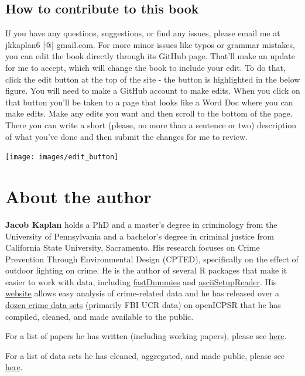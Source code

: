 \documentclass[
  12pt,
  openany]{book}
\begin{document}
\hypertarget{how-to-contribute-to-this-book}{%
\section{How to contribute to this book}\label{how-to-contribute-to-this-book}}

If you have any questions, suggestions, or find any issues, please email me at jkkaplan6 {[}@{]} gmail.com. For more minor issues like typos or grammar mistakes, you can edit the book directly through its GitHub page. That'll make an update for me to accept, which will change the book to include your edit. To do that, click the edit button at the top of the site - the button is highlighted in the below figure. You will need to make a GitHub account to make edits. When you click on that button you'll be taken to a page that looks like a Word Doc where you can make edits. Make any edits you want and then scroll to the bottom of the page. There you can write a short (please, no more than a sentence or two) description of what you've done and then submit the changes for me to review.

\texttt{[image: images/edit\_button]}

\hypertarget{about-the-author}{%
\chapter*{About the author}\label{about-the-author}}


\textbf{Jacob Kaplan} holds a PhD and a master's degree in criminology from the University of Pennsylvania and a bachelor's degree in criminal justice from California State University, Sacramento. His research focuses on Crime Prevention Through Environmental Design (CPTED), specifically on the effect of outdoor lighting on crime. He is the author of several R packages that make it easier to work with data, including \href{https://jacobkap.github.io/fastDummies/}{fastDummies} and \href{https://jacobkap.github.io/asciiSetupReader/}{asciiSetupReader}. His \href{http://jacobdkaplan.com/}{website} allows easy analysis of crime-related data and he has released over a \href{http://jacobdkaplan.com/data.html}{dozen crime data sets} (primarily FBI UCR data) on openICPSR that he has compiled, cleaned, and made available to the public.

For a list of papers he has written (including working papers), please see \href{http://jacobdkaplan.com/research.html}{here}.

For a list of data sets he has cleaned, aggregated, and made public, please see \href{http://jacobdkaplan.com/data.html}{here}.
\end{document}
